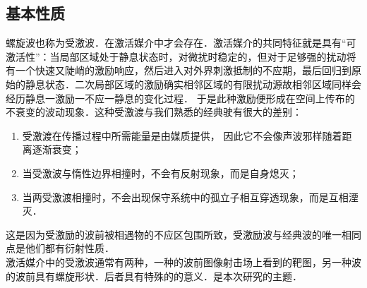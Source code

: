 \subsection{基本性质}
螺旋波也称为受激波．在激活媒介中才会存在．激活媒介的共同特征就是具有“可激活性”：当局部区域处于静息状态时，对微扰时稳定的，但对于足够强的扰动将有一个快速又陡峭的激励响应，然后进入对外界刺激抵制的不应期，最后回归到原始的静息状态．二次局部区域的激励确实相邻区域的有限扰动源故相邻区域同样会经历静息一激励一不应一静息的变化过程． 于是此种激励便形成在空间上传布的不衰变的波动现象．这种受激渡与我们熟悉的经典驶有很大的差别\cite{丁达夫1992心脏猝死的杀手}：
\begin{enumerate}
  \item 受激渡在传播过程中所需能量是由媒质提供， 因此它不会像声波邪样随着距离逐渐衰变；
  \item 当受激波与惰性边界相撞时，不会有反射现象，而是自身熄灭；
  \item 当两受激渡相撞时，不会出现保守系统中的孤立子相互穿透现象，而是互相湮灭．
\end{enumerate}
这是因为受激励的波前被相遇物的不应区包围所致，受激励波与经典波的唯一相同点是他们都有衍射性质．\\
激活媒介中的受激波通常有两种，一种的波前图像射击场上看到的靶图，另一种波的波前具有螺旋形状．后者具有特殊的的意义．是本次研究的主题．

